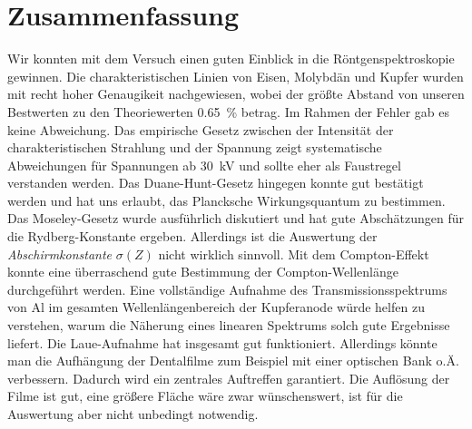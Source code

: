 \documentclass[paper=a4,fontsize=10pt,DIV=18,twocolumn,parskip=half]{scrartcl}
\numberwithin{equation}{section}    %
\begin{document}
\section{Zusammenfassung}
\label{Zusammenfassung}

Wir konnten mit dem Versuch einen guten Einblick in die Röntgenspektroskopie
gewinnen. Die charakteristischen Linien von Eisen, Molybdän und Kupfer wurden mit
recht hoher Genaugikeit nachgewiesen, wobei der größte Abstand von unseren
Bestwerten zu den Theoriewerten 
\SI{0.65}{\percent} betrag. Im Rahmen der Fehler gab es keine Abweichung. 
 Das empirische Gesetz zwischen der Intensität der
charakteristischen Strahlung und der Spannung zeigt systematische Abweichungen
für Spannungen ab \SI{30}{\kilo\volt} und sollte eher als Faustregel verstanden
werden. Das Duane-Hunt-Gesetz hingegen konnte gut bestätigt werden und hat uns
erlaubt, das Plancksche Wirkungsquantum zu bestimmen. Das Moseley-Gesetz wurde
ausführlich diskutiert und hat gute Abschätzungen für die Rydberg-Konstante
ergeben. Allerdings ist die Auswertung der \emph{Abschirmkonstante} $\sigma(Z)$
nicht wirklich sinnvoll. Mit dem Compton-Effekt konnte eine überraschend gute
Bestimmung der Compton-Wellenlänge durchgeführt werden. Eine vollständige
Aufnahme des Transmissionsspektrums von Al im gesamten Wellenlängenbereich der
Kupferanode würde helfen zu verstehen, warum die Näherung eines linearen
Spektrums solch gute Ergebnisse liefert. Die Laue-Aufnahme hat insgesamt gut
funktioniert. Allerdings könnte man die Aufhängung der Dentalfilme zum Beispiel
mit einer optischen Bank o.Ä. verbessern. Dadurch wird ein zentrales 
Auftreffen garantiert. Die Auflösung 
der Filme ist gut, eine größere Fläche wäre zwar wünschenswert, ist für die
Auswertung aber nicht unbedingt notwendig. 

%
%
%
%
\end{document}
